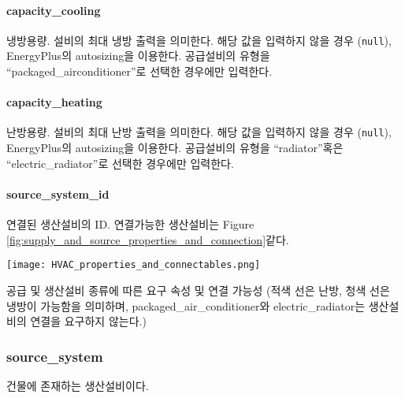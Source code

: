 \paragraph{capacity\_cooling} 냉방용량. 설비의 최대 냉방 출력을 의미한다. 해당 값을 입력하지 않을 경우 (\texttt{null}), EnergyPlus의 autosizing을 이용한다. 공급설비의 유형을 ``packaged\_airconditioner''로 선택한 경우에만 입력한다.

\paragraph{capacity\_heating} 난방용량. 설비의 최대 난방 출력을 의미한다. 해당 값을 입력하지 않을 경우 (\texttt{null}), EnergyPlus의 autosizing을 이용한다. 공급설비의 유형을 ``radiator''혹은 ``electric\_radiator''로 선택한 경우에만 입력한다.

\paragraph{source\_system\_id} 연결된 생산설비의 ID. 연결가능한 생산설비는 Figure \ref{fig:supply_and_source_properties_and_connection}\와 같다.

\begin{defaultfigure}
  \texttt{[image: HVAC\_properties\_and\_connectables.png]}
  \caption{공급 및 생산설비 종류에 따른 요구 속성 및 연결 가능성 (적색 선은 난방, 청색 선은 냉방이 가능함을 의미하며, packaged\_air\_conditioner와 electric\_radiator는 생산설비의 연결을 요구하지 않는다.)}
  \label{fig:supply_and_source_properties_and_connection}
\end{defaultfigure}

\subsubsection{source\_system} \label{subsubsection:ioref:sourcesystem}
건물에 존재하는 생산설비이다.

